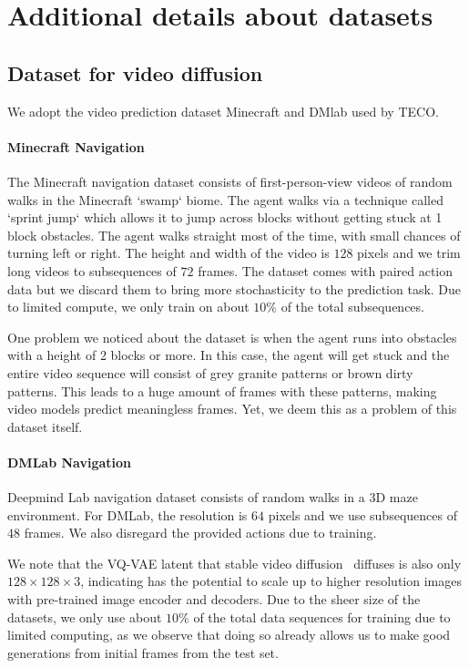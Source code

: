 \label{app:dataset_detail}
\section{Additional details about datasets}
\subsection{Dataset for video diffusion}
We adopt the video prediction dataset Minecraft and DMlab used by TECO\cite{yan2023temporally}.

\paragraph{Minecraft Navigation}
The Minecraft navigation dataset consists of first-person-view videos of random walks in the Minecraft `swamp` biome. The agent walks via a technique called `sprint jump` which allows it to jump across blocks without getting stuck at 1 block obstacles. The agent walks straight most of the time, with small chances of turning left or right. The height and width of the video is $128$ pixels and we trim long videos to subsequences of $72$ frames. The dataset comes with paired action data but we discard them to bring more stochasticity to the prediction task. Due to limited compute, we only train on about $10\%$ of the total subsequences.

One problem we noticed about the dataset is when the agent runs into obstacles with a height of 2 blocks or more. In this case, the agent will get stuck and the entire video sequence will consist of grey granite patterns or brown dirty patterns. This leads to a huge amount of frames with these patterns, making video models predict meaningless frames. Yet, we deem this as a problem of this dataset itself.  

\paragraph{DMLab Navigation}
Deepmind Lab navigation dataset consists of random walks in a 3D maze environment. For DMLab, the resolution is $64$ pixels and we use subsequences of $48$ frames. We also disregard the provided actions due to training.

We note that the VQ-VAE latent that stable video diffusion~\cite{blattmann2023stable} diffuses is also only $128\times128\times 3$, indicating \algo{} has the potential to scale up to higher resolution images with pre-trained image encoder and decoders. Due to the sheer size of the datasets, we only use about $10\%$ of the total data sequences for training due to limited computing, as we observe that doing so already allows us to make good generations from initial frames from the test set.

